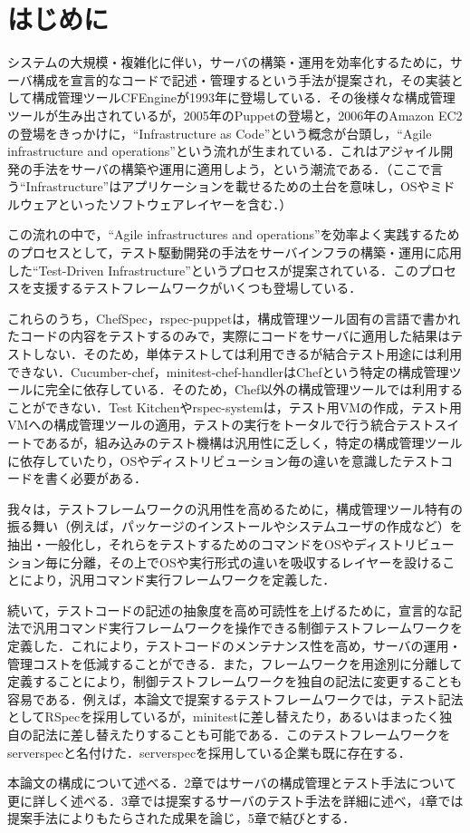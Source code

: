 \section{はじめに}

システムの大規模・複雑化に伴い，サーバの構築・運用を効率化するために，サーバ構成を宣言的なコードで記述・管理するという手法が提案され，その実装として構成管理ツールCFEngine\cite{cfengine}が1993年に登場している．その後様々な構成管理ツールが生み出されているが\cite{cmt}，2005年のPuppetの登場\cite{puppet}と，2006年のAmazon EC2の登場\cite{ec2}をきっかけに，``Infrastructure as Code''という概念が台頭し，``Agile infrastructure and operations''\cite{agile infrastructure}という流れが生まれている．これはアジャイル開発の手法をサーバの構築や運用に適用しよう，という潮流である．（ここで言う``Infrastructure''はアプリケーションを載せるための土台を意味し，OSやミドルウェアといったソフトウェアレイヤーを含む．）

この流れの中で，``Agile infrastructures and operations''を効率よく実践するためのプロセスとして，テスト駆動開発の手法をサーバインフラの構築・運用に応用した``Test-Driven Infrastructure''\cite{test driven infrastructure with chef}というプロセスが提案されている．このプロセスを支援するテストフレームワークがいくつも登場している\cite{chefspec}\cite{rspec-puppet}\cite{cucumber-chef}\cite{minitest-chef-handler}\cite{test kitchen}\cite{rspec-system}．

これらのうち，ChefSpec，rspec-puppetは，構成管理ツール固有の言語で書かれたコードの内容をテストするのみで，実際にコードをサーバに適用した結果はテストしない．そのため，単体テストしては利用できるが結合テスト用途には利用できない．Cucumber-chef，minitest-chef-handlerはChefという特定の構成管理ツールに完全に依存している．そのため，Chef以外の構成管理ツールでは利用することができない．Test Kitchenやrspec-systemは，テスト用VMの作成，テスト用VMへの構成管理ツールの適用，テストの実行をトータルで行う統合テストスイートであるが，組み込みのテスト機構は汎用性に乏しく，特定の構成管理ツールに依存していたり，OSやディストリビューション毎の違いを意識したテストコードを書く必要がある．

我々は，テストフレームワークの汎用性を高めるために，構成管理ツール特有の振る舞い（例えば，パッケージのインストールやシステムユーザの作成など）を抽出・一般化し，それらをテストするためのコマンドをOSやディストリビューション毎に分離，その上でOSや実行形式の違いを吸収するレイヤーを設けることにより，汎用コマンド実行フレームワークを定義した．

続いて，テストコードの記述の抽象度を高め可読性を上げるために，宣言的な記法で汎用コマンド実行フレームワークを操作できる制御テストフレームワークを定義した．これにより，テストコードのメンテナンス性を高め，サーバの運用・管理コストを低減することができる．また，フレームワークを用途別に分離して定義することにより，制御テストフレームワークを独自の記法に変更することも容易である．例えば，本論文で提案するテストフレームワークでは，テスト記法としてRSpec\cite{rspec}を採用しているが，minitest\cite{minitest}に差し替えたり，あるいはまったく独自の記法に差し替えたりすることも可能である．このテストフレームワークをserverspec\cite{serverspec}と名付けた．serverspecを採用している企業も既に存在する\cite{nintendo}．

本論文の構成について述べる．2章ではサーバの構成管理とテスト手法について更に詳しく述べる．3章では提案するサーバのテスト手法を詳細に述べ，4章では提案手法によりもたらされた成果を論じ，5章で結びとする．
